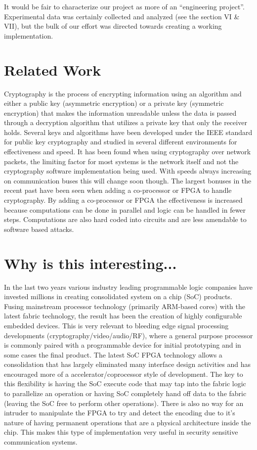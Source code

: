 \documentclass[journal]{IEEEtran}
\begin{document}
It would be fair to characterize our project as more of an “engineering project”.  Experimental data was certainly collected and analyzed (see the section VI \& VII), but the bulk of our effort was directed towards creating a working implementation.

\section{Related Work}
Cryptography is the process of encrypting information using an algorithm and either a public key (asymmetric encryption) or a private key (symmetric encryption) that makes the information unreadable unless the data is passed through a decryption algorithm that utilizes a private key that only the receiver holds\cite{HIPPA}. Several keys and algorithms have been developed under the IEEE standard for public key cryptography \cite{IEEESTD} and studied in several different environments for effectiveness and speed. It has been found when using cryptography over network packets, the limiting factor for most systems is the network itself and not the cryptography software implementation being used\cite{GUTMANN}. With speeds always increasing on communication buses this will change soon though. The largest bonuses in the recent past have been seen when adding a co-processor or FPGA to handle cryptography. By adding a co-processor or FPGA the effectiveness is increased because computations can be done in parallel and logic can be handled in fewer steps\cite{GUERON}. Computations are also hard coded into circuits and are less amendable to software based attacks\cite{GUTMANN}. 

\section{Why is this interesting...}
In the last two years various industry leading programmable logic companies have invested millions in creating consolidated system on a chip (SoC) products. Fusing mainstream processor technology (primarily ARM-based cores) with the latest fabric technology, the result has been the creation of highly configurable embedded devices. This is very relevant to bleeding edge signal processing developments (cryptography/video/audio/RF), where a general purpose processor is commonly paired with a programmable device for initial prototyping and in some cases the final product. The latest SoC FPGA technology allows a consolidation that has largely eliminated many interface design activities and has encouraged more of a accelerator/coprocessor style of development. The key to this flexibility is having the SoC execute code that may tap into the fabric logic to parallelize an operation or having SoC completely hand off data to the fabric (leaving the SoC free to perform other operations).  There is also no way for an intruder to manipulate the FPGA to try and detect the encoding due to it’s nature of having permanent operations that are a physical architecture inside the chip.  This makes this type of implementation very useful in security sensitive communication systems.
\end{document}
